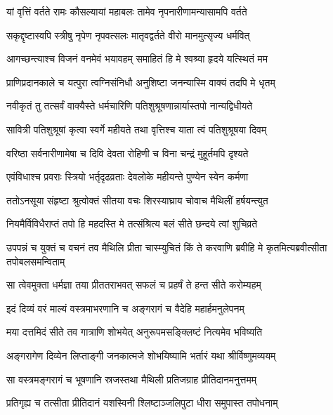 \twolineshloka
{यां वृत्तिं वर्तते रामः कौसल्यायां महाबलः}
{तामेव नृपनारीणामन्यासामपि वर्तते} %

\twolineshloka
{सकृद्दृष्टास्वपि स्त्रीषु नृपेण नृपवत्सलः}
{मातृवद्वर्तते वीरो मानमुत्सृज्य धर्मवित्} %

\twolineshloka
{आगच्छन्त्याश्च विजनं वनमेवं भयावहम्}
{समाहितं हि मे श्वश्र्वा हृदये यत्स्थितं मम} %

\twolineshloka
{प्राणिप्रदानकाले च यत्पुरा त्वग्निसंनिधौ}
{अनुशिष्टा जनन्यास्मि वाक्यं तदपि मे धृतम्} %

\twolineshloka
{नवीकृतं तु तत्सर्वं वाक्यैस्ते धर्मचारिणि}
{पतिशुश्रूषणान्नार्यास्तपो नान्यद्विधीयते} %

\twolineshloka
{सावित्री पतिशुश्रूषां कृत्वा स्वर्गे महीयते}
{तथा वृत्तिश्च याता त्वं पतिशुश्रूषया दिवम्} %

\twolineshloka
{वरिष्ठा सर्वनारीणामेषा च दिवि देवता}
{रोहिणी च विना चन्द्रं मुहूर्तमपि दृश्यते} %

\twolineshloka
{एवंविधाश्च प्रवराः स्त्रियो भर्तृदृढव्रताः}
{देवलोके महीयन्ते पुण्येन स्वेन कर्मणा} %

\twolineshloka
{ततोऽनसूया संहृष्टा श्रुत्वोक्तं सीतया वचः}
{शिरस्याघ्राय चोवाच मैथिलीं हर्षयन्त्युत} %

\twolineshloka
{नियमैर्विविधैराप्तं तपो हि महदस्ति मे}
{तत्संश्रित्य बलं सीते छन्दये त्वां शुचिव्रते} %

\threelineshloka
{उपपन्नं च युक्तं च वचनं तव मैथिलि}
{प्रीता चास्म्युचितं किं ते करवाणि ब्रवीहि मे}
{कृतमित्यब्रवीत्सीता तपोबलसमन्विताम्} %

\twolineshloka
{सा त्वेवमुक्ता धर्मज्ञा तया प्रीततराभवत्}
{सफलं च प्रहर्षं ते हन्त सीते करोम्यहम्} %

\twolineshloka
{इदं दिव्यं वरं माल्यं वस्त्रमाभरणानि च}
{अङ्गरागं च वैदेहि महार्हमनुलेपनम्} %

\twolineshloka
{मया दत्तमिदं सीते तव गात्राणि शोभयेत्}
{अनुरूपमसङ्क्लिष्टं नित्यमेव भविष्यति} %

\twolineshloka
{अङ्गरागेण दिव्येन लिप्ताङ्गी जनकात्मजे}
{शोभयिष्यामि भर्तारं यथा श्रीर्विष्णुमव्ययम्} %

\twolineshloka
{सा वस्त्रमङ्गरागं च भूषणानि स्रजस्तथा}
{मैथिली प्रतिजग्राह प्रीतिदानमनुत्तमम्} %

\twolineshloka
{प्रतिगृह्य च तत्सीता प्रीतिदानं यशस्विनी}
{श्लिष्टाञ्जलिपुटा धीरा समुपास्त तपोधनाम्} %


